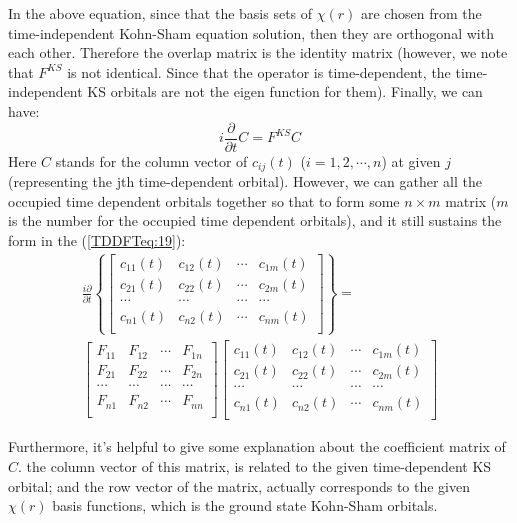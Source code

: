 In the above equation, since that the basis sets of $\chi(r)$ are
chosen from the time-independent Kohn-Sham equation solution, then
they are orthogonal with each other. Therefore the overlap matrix is
the identity matrix (however, we note that $F^{KS}$ is not
identical. Since that the operator is time-dependent, the
time-independent KS orbitals are not the eigen function for them).
Finally, we can have:
\begin{equation}\label{TDDFTeq:19}
i\frac{\partial}{\partial t}C = F^{KS}C
\end{equation}
Here $C$ stands for the column vector of $c_{ij}(t)$ ($i=1,2,\cdots,
n$) at given $j$ (representing the jth time-dependent orbital).
However, we can gather all the occupied time dependent orbitals
together so that to form some $n\times m$ matrix ($m$ is the number
for the occupied time dependent orbitals), and it still sustains the
form in the (\ref{TDDFTeq:19}):
\begin{multline}\label{TDDFT_Added_eq:1}
\frac{i\partial}{\partial t}
\left\{
\begin{bmatrix}
  c_{11}(t) &  c_{12}(t) & \cdots & c_{1m}(t) \\
  c_{21}(t) &  c_{22}(t) & \cdots & c_{2m}(t) \\
  \cdots    & \cdots     & \cdots & \cdots    \\
  c_{n1}(t) &  c_{n2}(t) & \cdots & c_{nm}(t) \\
\end{bmatrix}
\right\} = \\
\begin{bmatrix}
     F_{11} & F_{12} & \cdots & F_{1n} \\
     F_{21} & F_{22} & \cdots & F_{2n} \\
     \cdots & \cdots & \cdots & \cdots \\
     F_{n1} & F_{n2} & \cdots & F_{nn} \\
   \end{bmatrix}
\begin{bmatrix}
  c_{11}(t) &  c_{12}(t) & \cdots & c_{1m}(t) \\
  c_{21}(t) &  c_{22}(t) & \cdots & c_{2m}(t) \\
  \cdots    & \cdots     & \cdots & \cdots    \\
  c_{n1}(t) &  c_{n2}(t) & \cdots & c_{nm}(t) \\
\end{bmatrix}
\end{multline}

Furthermore, it's helpful to give some explanation about the
coefficient matrix of $C$. the column vector of this matrix, is
related to the given time-dependent KS orbital; and the row vector
of the matrix, actually corresponds to the given $\chi(r)$ basis
functions, which is the ground state Kohn-Sham orbitals.

